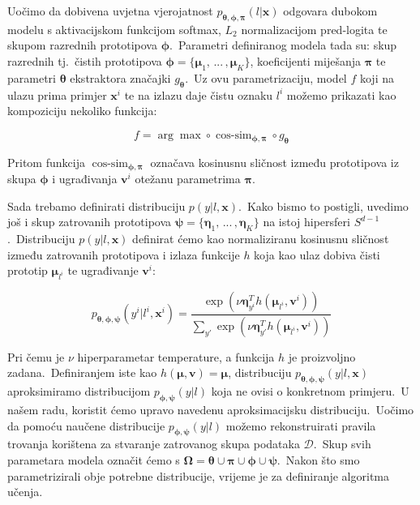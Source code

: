 \documentclass[diplomskirad]{fer}
\begin{document}
Uočimo da dobivena uvjetna vjerojatnost $p_{\bm{\theta}, \bm{\phi}, \bm{\pi}}(l | \bm{x})$ odgovara dubokom modelu s aktivacijskom funkcijom softmax, $L_2$ normalizacijom pred-logita te skupom razrednih prototipova $\bm{\phi}$.\ 
Parametri definiranog modela tada su: skup razrednih tj.\ čistih prototipova $\bm{\phi} = \{\bm{\mu}_1,\,...\,,\bm{\mu}_K\}$, koeficijenti miješanja $\bm{\pi}$ te parametri $\bm{\theta}$ ekstraktora značajki $g_{\bm{\theta}}$.\ 
Uz ovu parametrizaciju, model $f$ koji na ulazu prima primjer $\bm{x}^i$ te na izlazu daje čistu oznaku $l^i$ možemo prikazati kao kompoziciju nekoliko funkcija:

\begin{equation}
  f = \arg \max \circ \operatorname{cos\text{-}sim}_{\bm{\phi}, \bm{\pi}} \circ g_{\bm{\theta}}
  \label{eq:h_form}
\end{equation}

Pritom funkcija $\operatorname{cos\text{-}sim}_{\bm{\phi}, \bm{\pi}}$ označava kosinusnu sličnost između prototipova iz skupa $\bm{\phi}$ i ugrađivanja $\bm{v}^i$ otežanu parametrima $\bm{\pi}$.\ 

Sada trebamo definirati distribuciju $p(y | l, \bm{x})$.\ Kako bismo to postigli, uvedimo još i skup zatrovanih prototipova $\bm{\psi} = \{\bm{\eta}_1,\,...\,,\bm{\eta}_K\}$ na istoj hipersferi $S^{d - 1}$.\ 
Distribuciju $p(y | l, \bm{x})$ definirat ćemo kao normaliziranu kosinusnu sličnost između zatrovanih prototipova i izlaza funkcije $h$ koja kao ulaz dobiva čisti prototip $\bm{\mu}_{l^i}$ te ugrađivanje $\bm{v}^i$:

\begin{equation}
  p_{\bm{\theta}, \bm{\phi}, \bm{\psi}}(y^i | l^i, \bm{x}^i) = \frac{\exp(\nu \bm{\eta}_{y^i}^T h(\bm{\mu}_{l^i}, \bm{v}^i))}{\sum_{y'} \exp(\nu \bm{\eta}_{y'}^T h(\bm{\mu}_{l^i}, \bm{v}^i))}
  \label{eq:p_y_l}
\end{equation}

Pri čemu je $\nu$ hiperparametar temperature, a funkcija $h$ je proizvoljno zadana.\ Definiranjem iste kao $h(\bm{\mu}, \bm{v}) = \bm{\mu}$, distribuciju $p_{\bm{\theta}, \bm{\phi}, \bm{\psi}}(y | l, \bm{x})$ aproksimiramo distribucijom $p_{\bm{\phi}, \bm{\psi}}(y | l)$ koja ne ovisi o konkretnom primjeru.\ 
U našem radu, koristit ćemo upravo navedenu aproksimacijsku distribuciju.\ Uočimo da pomoću naučene distribucije $p_{\bm{\phi}, \bm{\psi}}(y | l)$ možemo rekonstruirati pravila trovanja korištena za stvaranje zatrovanog skupa podataka $\mathcal{D}$.\ 
Skup svih parametara modela označit ćemo s $\bm{\Omega} = \bm{\theta} \cup \bm{\pi} \cup \bm{\phi} \cup \bm{\psi}$.\ Nakon što smo parametrizirali obje potrebne distribucije, vrijeme je za definiranje algoritma učenja.\
\end{document}
